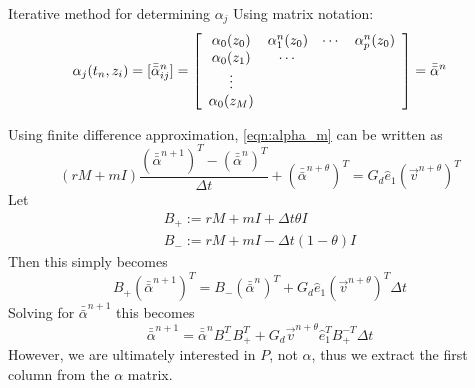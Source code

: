 \documentclass[final]{beamer} %
\newcommand{\am}{\bar{\bar{\alpha}}}
\begin{document}
\begin{frame}[t]
\begin{columns}[t]
\begin{column}{0.28\paperwidth}
%
\begin{block}{Iterative method for determining $\alpha_j$}
Using matrix notation:
\[
\alpha_j(t_n, z_i) = [\bar{\bar{\alpha}}_{ij}^n] = 
\left[ \begin{array}{c c c c}
\alpha_0 (z_0) & \alpha_1^n(z_0) & \cdots & \alpha_p^n (z_0)\\
\alpha_0 (z_1) & \cdots          &        &                 \\
\vdots          &                &        &                 \\
\alpha_0 (z_M)  &                &        &                 \\
\end{array}\right] =
\bar{\bar{\alpha}}^n
\]

Using finite difference approximation, \ref{eqn:alpha_m} can be written as 
\begin{equation}
(rM + mI) \frac{(\am^{n+1})^T - (\am^n)^T}{\Delta t} + (\am^{n+\theta})^T =
G_d \hat{e}_1 (\vec{v}^{n+\theta})^T
\end{equation}
Let
\[ \begin{array}{c}
B_+ := rM + mI + \Delta t \theta I \\
B_- := rM + mI - \Delta t (1-\theta) I
\end{array} \]
Then this simply becomes
\begin{equation}
B_+ (\am^{n+1})^T = B_- (\am^n)^T + G_d \hat{e}_1 (\vec{v}^{n+\theta})^T \Delta t
\end{equation}
Solving for $\am^{n+1}$ this becomes
\begin{equation}
\am^{n+1} = \am^n B_-^T B_+^T + G_d \vec{v}^{n+\theta} \hat{e}_1^T B_+^{-T} \Delta t
\end{equation}
However, we are ultimately interested in $P$, not $\alpha$, thus we extract the first column from the $\alpha$ matrix.
\end{block}


\end{column}
\end{columns}
\end{frame}
\end{document}
